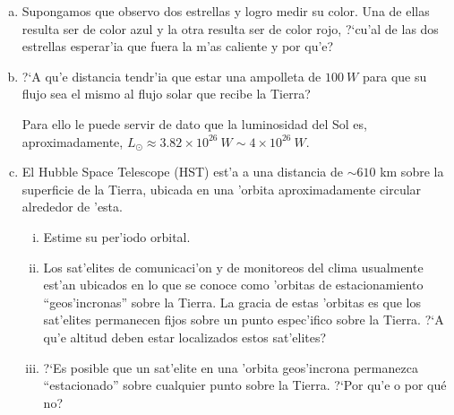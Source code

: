 \documentclass{article}
\begin{document}
\begin{enumerate}[a)]
\item Supongamos que observo dos estrellas y logro medir su color. Una de ellas resulta ser de color azul y la otra resulta ser de color rojo, ?`cu'al de las dos estrellas esperar'ia que fuera la m'as caliente y por qu'e?

\item ?`A qu'e distancia tendr'ia que estar una ampolleta de $100 \ W$ para que su flujo sea el mismo al flujo solar que recibe la Tierra? 

Para ello le puede servir de dato que la luminosidad del Sol es, aproximadamente, $L_\odot \approx 3.82 \times 10^{26} \ W \sim 4 \times 10^{26} \ W$.

\item El Hubble Space Telescope (HST) est'a a una distancia de $\sim 610$ km sobre la superficie de la Tierra, ubicada en una 'orbita aproximadamente circular alrededor de 'esta.




\begin{enumerate}[i)]
\item Estime su per'iodo orbital.

\item Los sat'elites de comunicaci'on y de monitoreos del clima usualmente est'an ubicados en lo que se conoce como 'orbitas de estacionamiento ``geos'incronas'' sobre la Tierra. La gracia de estas 'orbitas es que los sat'elites permanecen fijos sobre un punto espec'ifico sobre la Tierra. ?`A qu'e altitud deben estar localizados estos sat'elites?

\item ?`Es posible que un sat'elite en una 'orbita geos'incrona permanezca ``estacionado'' sobre cualquier punto sobre la Tierra. ?`Por qu'e o por qué no?
\end{enumerate}





\end{enumerate}
\end{document}
